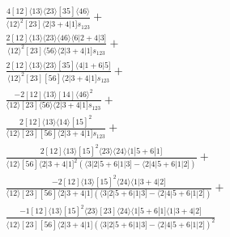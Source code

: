 \documentclass[varwidth, border=5pt]{standalone}
\begin{document}
\begin{my}
$\begin{gathered}
\scriptscriptstyle\frac{4[12]⟨13⟩⟨23⟩[35]⟨46⟩}{⟨12⟩^2[23]⟨2|3+4|1]s_{123}}+\\
\scriptscriptstyle\frac{2[12]⟨13⟩⟨23⟩⟨46⟩⟨6|2+4|3]}{⟨12⟩^2[23]⟨56⟩⟨2|3+4|1]s_{123}}+\\
\scriptscriptstyle\frac{2[12]⟨13⟩⟨23⟩[35]⟨4|1+6|5]}{⟨12⟩^2[23][56]⟨2|3+4|1]s_{123}}+\\
\scriptscriptstyle\frac{-2[12]⟨13⟩[14]⟨46⟩^2}{⟨12⟩[23]⟨56⟩⟨2|3+4|1]s_{123}}+\\
\scriptscriptstyle\frac{2[12]⟨13⟩⟨14⟩[15]^2}{⟨12⟩[23][56]⟨2|3+4|1]s_{123}}+\\
\scriptscriptstyle\frac{2[12]⟨13⟩[15]^2⟨23⟩⟨24⟩⟨1|5+6|1]}{⟨12⟩[56]⟨2|3+4|1]^2(⟨3|2|5+6|1|3]-⟨2|4|5+6|1|2])}+\\
\scriptscriptstyle\frac{-2[12]⟨13⟩[15]^2⟨24⟩⟨1|3+4|2]}{⟨12⟩[23][56]⟨2|3+4|1](⟨3|2|5+6|1|3]-⟨2|4|5+6|1|2])}+\\
\scriptscriptstyle\frac{-1[12]⟨13⟩[15]^2⟨23⟩[23]⟨24⟩⟨1|5+6|1]⟨1|3+4|2]}{⟨12⟩[23][56]⟨2|3+4|1](⟨3|2|5+6|1|3]-⟨2|4|5+6|1|2])^2}\phantom{+}
\end{gathered}$
\end{my}
\end{document}
